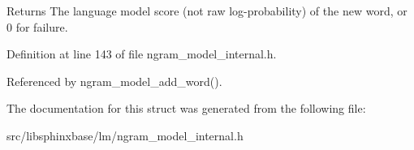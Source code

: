 \begin{DoxyReturn}{Returns}
The language model score (not raw log-\/probability) of the new word, or 0 for failure. 
\end{DoxyReturn}


Definition at line 143 of file ngram\-\_\-model\-\_\-internal.\-h.



Referenced by ngram\-\_\-model\-\_\-add\-\_\-word().



The documentation for this struct was generated from the following file\-:\begin{DoxyCompactItemize}
\item 
src/libsphinxbase/lm/ngram\-\_\-model\-\_\-internal.\-h\end{DoxyCompactItemize}
